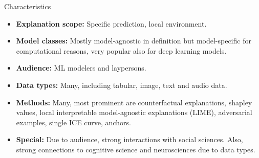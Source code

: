 \documentclass[aspectratio=169]{../latex_main/tntbeamer}  %
\begin{document}
\begin{frame}[c]{Characteristics}
	\begin{itemize}
		\item \textbf{Explanation scope:} Specific prediction, local environment.
		\pause\smallskip
		\item \textbf{Model classes:} Mostly model-agnostic in definition but model-specific for computational reasons, very popular also for deep learning models.
		\pause\smallskip
		\item \textbf{Audience:} ML modelers and laypersons.
		\pause\smallskip
		\item \textbf{Data types:} Many, including tabular, image, text and audio data.
		\pause\smallskip
		\item \textbf{Methods:} Many, most prominent are counterfactual explanations, shapley values, local interpretable model-agnostic explanations (LIME), adversarial examples, single ICE curve, anchors.
		\pause\smallskip
		\item \textbf{Special:} Due to audience, strong interactions with social sciences. Also, strong connections to cognitive science and neurosciences due to data types.
	\end{itemize}
\end{frame}
\end{document}

